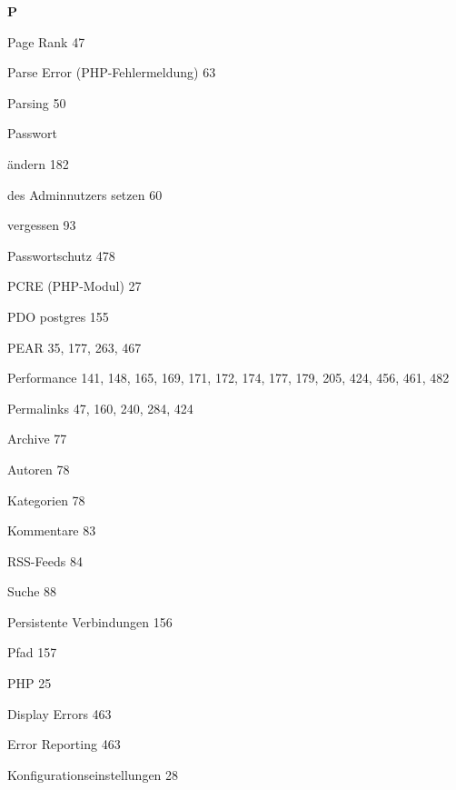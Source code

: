 \documentclass{book}
\renewcommand\indexspace{\vspace{11pt}}
\renewcommand\subitem{\par}
\begin{document}
\begin{multicols}{2}
\begin{osp-index}
  \indexspace
{\sffamily\bfseries P}\nopagebreak

  \item Page Rank\hspace{1mm} 47
  \item Parse Error (PHP-Fehlermeldung)\hspace{1mm} 63
  \item Parsing\hspace{1mm} 50
  \item Passwort
    \subitem \"andern\hspace{1mm} 182
    \subitem des Adminnutzers setzen\hspace{1mm} 60
    \subitem vergessen\hspace{1mm} 93
  \item Passwortschutz\hspace{1mm} 478
  \item PCRE (PHP-Modul)\hspace{1mm} 27
  \item PDO postgres\hspace{1mm} 155
  \item PEAR\hspace{1mm} 35, 177, 263, 467
  \item Performance\hspace{1mm} 141, 148, 165, 169, 171, 172, 174, 177, 
		179, 205, 424, 456, 461, 482
  \item Permalinks\hspace{1mm} 47, 160, 240, 284, 424
    \subitem Archive\hspace{1mm} 77
    \subitem Autoren\hspace{1mm} 78
    \subitem Kategorien\hspace{1mm} 78
    \subitem Kommentare\hspace{1mm} 83
    \subitem RSS-Feeds\hspace{1mm} 84
    \subitem Suche\hspace{1mm} 88
  \item Persistente Verbindungen\hspace{1mm} 156
  \item Pfad\hspace{1mm} 157
  \item PHP\hspace{1mm} 25
    \subitem Display Errors\hspace{1mm} 463
    \subitem Error Reporting\hspace{1mm} 463
    \subitem Konfigurationseinstellungen\hspace{1mm} 28

\end{osp-index}
\end{multicols}
\end{document}
